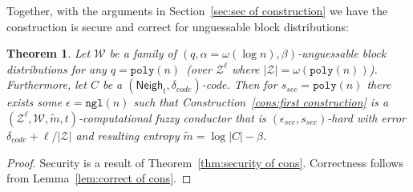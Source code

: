 \documentclass[11pt]{article}
\newcommand{\secref}[1]{\mbox{Section~\ref{#1}}}
\newcommand{\thref}[1]{\mbox{Theorem~\ref{#1}}}
\newcommand{\lemref}[1]{\mbox{Lemma~\ref{#1}}}
\newcommand{\consref}[1]{\mbox{Construction~\ref{#1}}}
\DeclareMathOperator*{\expe}{\mathbb{E}}
\newcommand{\class}[1]{{\ensuremath{\mathsf{#1}}}}
\newcommand{\neigh}{\ensuremath{\class{Neigh}}\xspace}
\newcommand{\dis}{\ensuremath{\mathsf{dis}}}
\newcommand{\poly}{\ensuremath{\mathtt{poly}}\xspace}
\newcommand{\ngl}{\ensuremath{\mathtt{ngl}}\xspace}
\newtheorem{theorem}{Theorem}[section]
\newtheorem{lemma}[theorem]{Lemma}
\newcommand{\authnote}[2]{{\textcolor{red}{\textsf{#1 notes: }\textcolor{blue}{ #2}}\marginpar{\textcolor{red}{\textbf{!!!!!}}}}}
\newcommand{\authnote}[2]{}
\newcommand{\bnote}[1]{{\authnote{Ben}{#1}}}
\begin{document}

Together, with the arguments in \secref{sec:sec of construction} we have the construction is secure and correct for unguessable block distributions:
\begin{theorem}
Let $\mathcal{W}$ be a family of $(q,\alpha= \omega(\log n),  \beta)$-unguessable block distributions for any $q = \poly(n)$~(over $\mathcal{Z}^\ell$ where $|\mathcal{Z}| = \omega(\poly(n))$).  Furthermore, let $C$ be a $(\neigh_t, \delta_{code})$-code.  Then for $s_{sec} = \poly(n)$ there exists some $\epsilon=\ngl(n)$ such that \consref{cons:first construction} is a $(\mathcal{Z}^\ell, \mathcal{W}, \tilde{m}, t)$-computational fuzzy conductor that is $(\epsilon_{sec}, s_{sec})$-hard with error $\delta_{code} + \ell/|\mathcal{Z}|$ and resulting entropy $\tilde{m} =\log |C| - \beta$.
\end{theorem}
\begin{proof}
Security is a result of \thref{thm:security of cons}.  Correctness follows from \lemref{lem:correct of cons}.
\end{proof}
\end{document}
